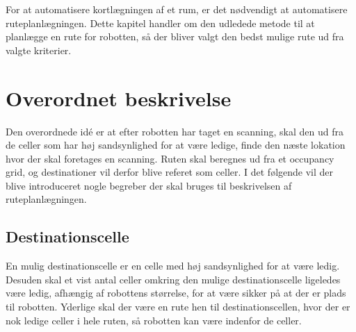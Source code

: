 \label{ruteplanleagning}
\newcommand{\unkcell}[3][]{\node (robot) [draw,fill=yellow, text centered, rectangle,
minimum height=\cellsize cm,minimum width=\cellsize cm, align=right] at ($(#2*\cellsize,#3*\cellsize) + (\cellsize/2,\cellsize/2)$) {$\scriptstyle #1$};}

\newcommand{\emptycell}[3][]{\node (robot) [draw,fill=green, text centered, rectangle,
minimum height=\cellsize cm,minimum width=\cellsize cm, align=right] at ($(#2*\cellsize,#3*\cellsize) + (\cellsize/2,\cellsize/2)$) {$\scriptstyle #1$};}

\newcommand{\occcell}[3][]{\node (robot) [draw,fill=red, text centered, rectangle,
minimum height=\cellsize cm,minimum width=\cellsize cm, align=right] at ($(#2*\cellsize,#3*\cellsize) + (\cellsize/2,\cellsize/2)$) {$\scriptstyle #1$};}

\newcommand{\scancell}[3][]{\node (robot) [draw,fill=orange, text centered, rectangle,
minimum height=\cellsize cm,minimum width=\cellsize cm, align=right] at ($(#2*\cellsize,#3*\cellsize) + (\cellsize/2,\cellsize/2)$) {$\scriptstyle #1$};}

\newcommand{\destcell}[3][]{\node (robot) [draw,fill=blue, text centered, rectangle,
minimum height=\cellsize cm,minimum width=\cellsize cm, align=right] at ($(#2*\cellsize,#3*\cellsize) + (\cellsize/2,\cellsize/2)$) {$\scriptstyle #1$};}

For at automatisere kortlægningen af et rum, er det nødvendigt at automatisere ruteplanlægningen.
Dette kapitel handler om den udledede metode til at planlægge en rute for robotten, så der bliver valgt den bedst mulige rute ud fra valgte kriterier.

\section{Overordnet beskrivelse}
Den overordnede idé er at efter robotten har taget en scanning, skal den ud fra de celler som har høj sandsynlighed for at være ledige, finde den næste lokation hvor der skal foretages en scanning.
Ruten skal beregnes ud fra et occupancy grid, og destinationer vil derfor blive referet som celler.
I det følgende vil der blive introduceret nogle begreber der skal bruges til beskrivelsen af ruteplanlægningen.

\subsection{Destinationscelle}\label{rute:destinationscelle}
En mulig destinationscelle er en celle med høj sandsynlighed for at være ledig.
Desuden skal et vist antal celler omkring den mulige destinationscelle ligeledes være ledig, afhængig af robottens størrelse, for at være sikker på at der er plads til robotten.
Yderlige skal der være en rute hen til destinationscellen, hvor der er nok ledige celler i hele ruten, så robotten kan være indenfor de celler.

